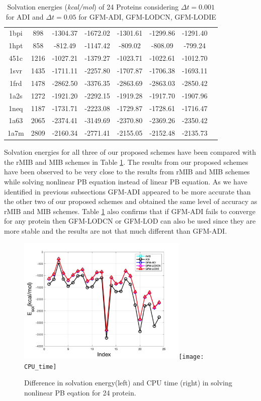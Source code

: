 \begin{table}[!ht]
\begin{tabular}{ c c c c c c c c}
1bpi & 898  & -1304.37 & -1672.02 & -1301.61 & -1299.86 & -1291.40 \\
1hpt & 858  & -812.49  & -1147.42 & -809.02  & -808.09  & -799.24  \\
451c & 1216 & -1027.21 & -1379.27 & -1023.71 & -1022.61 & -1012.70 \\
1svr & 1435 & -1711.11 & -2257.80 & -1707.87 & -1706.38 & -1693.11 \\
1frd & 1478 & -2862.50 & -3376.35 & -2863.69 & -2863.03 & -2850.42 \\
1a2s & 1272 & -1921.20 & -2292.15 & -1919.28 & -1917.70 & -1907.96 \\
1neq & 1187 & -1731.71 & -2223.08 & -1729.87 & -1728.61 & -1716.47 \\
1a63 & 2065 & -2374.41 & -3149.69 & -2370.80 & -2369.26 & -2350.42 \\
1a7m & 2809 & -2160.34 & -2771.41 & -2155.05 & -2152.48 & -2135.73 \\ \hline
\end{tabular}
\caption{Solvation energies ({\it kcal/mol}) of 24 Proteins considering $\Delta t = 0.001$ for ADI and $\Delta t =0.05$ for GFM-ADI, GFM-LODCN, GFM-LODIE}
\label{tab_24protein}
\end{table}
Solvation energies for all three of our proposed schemes have been compared  with the rMIB and MIB schemes in Table \ref{tab_24protein}. The results from our proposed schemes have been observed to be very close to the results from rMIB and MIB schemes while solving nonlinear PB equation instead of linear PB equation. As we have identified in previous subsections GFM-ADI  appeared to be more accurate than the other two of our proposed schemes and obtained the same level of accuracy as rMIB and MIB schemes. Table \ref{tab_24protein} also confirms that if GFM-ADI fails to converge for any protein then GFM-LODCN or GFM-LOD can also be used since they are more stable and the results are not that much different than GFM-ADI.   
\begin{figure}
	\centering
	\includegraphics[width=3.2in]{24_energy}\texttt{[image: CPU\_time]}
\caption{Difference in solvation energy(left) and CPU time (right) in solving nonlinear PB eqation for 24 protein. }
\end{figure}

